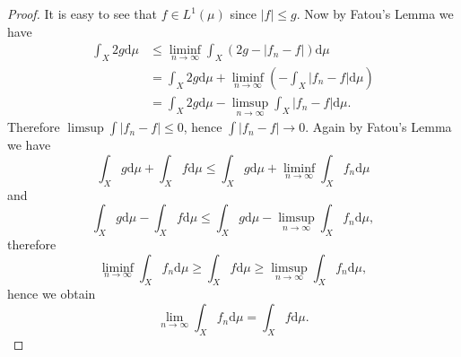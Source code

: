 \begin{proof}
It is easy to see that $f\in L^1(\mu)$ since $|f|\le g$. Now by Fatou's Lemma we have 
$$
\begin{aligned}
\int_X2g\mathrm{d}\mu&\le\liminf_{n\to\infty}\int_X(2g-|f_n-f|)\mathrm{d}\mu\\
&=\int_X2g\mathrm{d}\mu+\liminf_{n\to\infty}\left(-\int_X|f_n-f|\mathrm{d}\mu\right)\\
&=\int_X2g\mathrm{d}\mu-\limsup_{n\to\infty}\int_X|f_n-f|\mathrm{d}\mu.
\end{aligned}
$$
Therefore $\limsup\int|f_n-f|\le 0$, hence $\int|f_n-f|\to 0$. Again by Fatou's Lemma we have 
$$
\int_X{g\mathrm{d}\mu}+\int_X{f\mathrm{d}\mu}\le \int_X{g\mathrm{d}\mu}+\liminf_{n\to\infty}\int_X{f_n\mathrm{d}\mu}$$
and
$$\int_X{g\mathrm{d}\mu}-\int_X{f\mathrm{d}\mu}\le \int_X{g\mathrm{d}\mu}-\limsup_{n\to\infty}\int_X{f_n\mathrm{d}\mu},
$$
therefore 
$$\liminf_{n\to\infty}\int_Xf_n\mathrm{d}\mu\ge\int_Xf\mathrm{d}\mu\ge\limsup_{n\to\infty}\int_Xf_n\mathrm{d}\mu,$$
hence we obtain 
$$\lim_{n\to\infty}\int_Xf_n\mathrm{d}\mu=\int_Xf\mathrm{d}\mu.$$
\end{proof}
